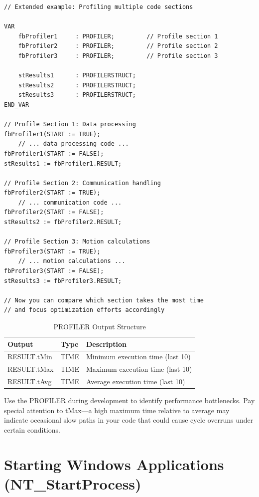 \documentclass[11pt,a4paper]{article}
\begin{document}
\begin{lstlisting}
// Extended example: Profiling multiple code sections

VAR
    fbProfiler1     : PROFILER;         // Profile section 1
    fbProfiler2     : PROFILER;         // Profile section 2
    fbProfiler3     : PROFILER;         // Profile section 3
    
    stResults1      : PROFILERSTRUCT;
    stResults2      : PROFILERSTRUCT;
    stResults3      : PROFILERSTRUCT;
END_VAR

// Profile Section 1: Data processing
fbProfiler1(START := TRUE);
    // ... data processing code ...
fbProfiler1(START := FALSE);
stResults1 := fbProfiler1.RESULT;

// Profile Section 2: Communication handling
fbProfiler2(START := TRUE);
    // ... communication code ...
fbProfiler2(START := FALSE);
stResults2 := fbProfiler2.RESULT;

// Profile Section 3: Motion calculations
fbProfiler3(START := TRUE);
    // ... motion calculations ...
fbProfiler3(START := FALSE);
stResults3 := fbProfiler3.RESULT;

// Now you can compare which section takes the most time
// and focus optimization efforts accordingly
\end{lstlisting}

\begin{table}[h]
\centering
\begin{tabular}{@{}lll@{}}
\toprule
\textbf{Output} & \textbf{Type} & \textbf{Description} \\
\midrule
RESULT.tMin & TIME & Minimum execution time (last 10) \\
RESULT.tMax & TIME & Maximum execution time (last 10) \\
RESULT.tAvg & TIME & Average execution time (last 10) \\
\bottomrule
\end{tabular}
\caption{PROFILER Output Structure}
\end{table}

\begin{tipbox}
Use the PROFILER during development to identify performance bottlenecks. Pay special attention to tMax---a high maximum time relative to average may indicate occasional slow paths in your code that could cause cycle overruns under certain conditions.
\end{tipbox}

\section{Starting Windows Applications (NT\_StartProcess)}
\end{document}
